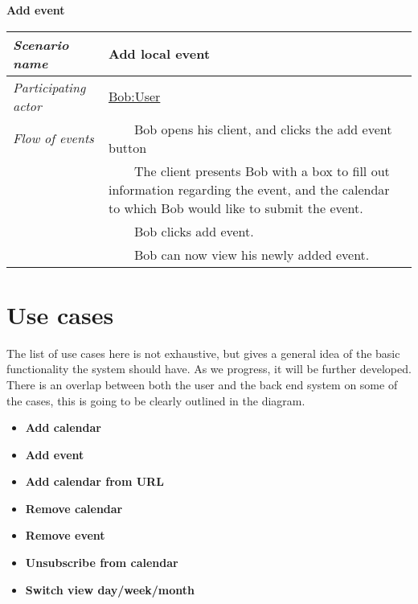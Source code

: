 \documentclass[10pt]{report}
\newcommand{\tabitem}{~~\llap{\textbullet}~~}
\numberwithin{equation}{section} %
\numberwithin{figure}{section} %
\numberwithin{table}{section} %
\begin{document}
\begin{table}[H]
\noindent \textbf{Add event}\\
\begin{tabularx}{\textwidth}{l X}
\midrule
\textit{Scenario name} & Add local event \\ \midrule
\textit{Participating actor} & \underline{Bob:User} \\ \midrule
\textit{Flow of events} & \tabitem Bob opens his client, and clicks the add
                                       event button \\
                                       & \tabitem The client presents Bob with
                                       a box to fill out information regarding
                                       the event, and the calendar to which Bob
                                       would like to submit the event.  \\
                                       & \tabitem Bob clicks add event.  \\
                                       & \tabitem Bob can now view his newly
                                       added event. \\
                                       \midrule
\end{tabularx}
\end{table}

\section{Use cases}
The list of use cases here is not exhaustive, but gives a general idea of the
basic functionality the system should have. As we progress, it will be further
developed. There is an overlap between both the user and the back end system on
some of the cases, this is going to be clearly outlined in the diagram.
\begin{itemize}
\item \textbf{Add calendar}
\item \textbf{Add event}
\item \textbf{Add calendar from URL}
\item \textbf{Remove calendar }
\item \textbf{Remove event}
\item \textbf{Unsubscribe from calendar}
\item \textbf{Switch view day/week/month}
\end{itemize}
\end{document}
